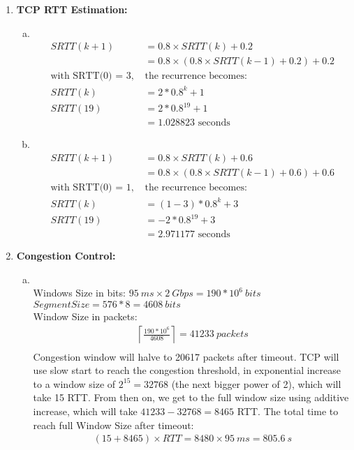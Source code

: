 \documentclass[11pt]{article}
\begin{document}
\begin{enumerate}[1.]
 \item %
 \textbf { TCP RTT Estimation: }
 	\begin{enumerate}[(a)]
 	\item \textbf{ 
  } \\
  \begin{align*}
    SRTT(k+1) &= 0.8 \times SRTT(k) + 0.2 \\
      &= 0.8 \times (0.8 \times SRTT(k-1) + 0.2) + 0.2 \\
    \text{with SRTT(0) = 3, } & \text{the recurrence becomes:}\\ 
    SRTT(k) &= 2 * 0.8^k + 1 \\
    SRTT(19) &= 2 * 0.8^{19} + 1 \\
      &= 1.028823 \text{ seconds}
  \end{align*}
 	\item \textbf{
  } \\
  \begin{align*}
    SRTT(k+1) &= 0.8 \times SRTT(k) + 0.6 \\
    &= 0.8 \times (0.8 \times SRTT(k-1) + 0.6) + 0.6 \\
    \text{with SRTT(0) = 1, } & \text{the recurrence becomes:}\\ 
    SRTT(k) &= (1-3) * 0.8^k + 3 \\
    SRTT(19) &= -2 * 0.8^{19} + 3 \\
    &= 2.971177 \text{ seconds}
  \end{align*}
 	\end{enumerate}

 \newpage
 \item %
 \textbf { Congestion Control: }
 	\begin{enumerate}[(a)]
 	\item \textbf{
  } \\
  Windows Size in bits: $95\ ms \times 2\ Gbps = 190 * 10^6\ bits$\\
  $Segment Size = 576 * 8 = 4608\ bits$ \\
  Window Size in packets: 
  \begin{align*}
    \left\lceil\frac{190*10^6}{4608}\right\rceil = 41233\ packets\\
  \end{align*} 
  Congestion window will halve to 20617 packets after timeout. TCP will use slow start to reach  the congestion threshold, in exponential increase to a window size of $2^{15} = 32768$ (the next bigger power of 2), which will take 15 RTT. From then on, we get to the full window size using additive increase, which will take $41233 - 32768 = 8465$ RTT. The total time to reach full Window Size after timeout: 
  \begin{align*}
    (15 + 8465) \times RTT = 8480 \times 95\ ms = 805.6\ s
  \end{align*}


\end{enumerate}
\end{enumerate}
\end{document}
